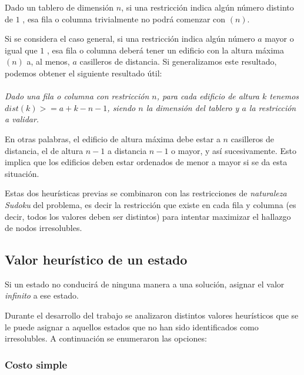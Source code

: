 \documentclass[%
    final,
    reprint,
    notitlepage,
    narroweqnarray,
    inline,
    twoside,
    invited
    ]{ieee}
\begin{document}
\par Dado un tablero de dimensión $n$, si una restricción indica algún número distinto de $1$ , esa fila o columna trivialmente no podrá comenzar con $(n)$.\\
\par Si se considera el caso general, si una restricción indica algún número $a$ mayor o igual que $1$ , esa fila o columna deberá tener un edificio con la altura máxima $(n)$ a, al menos, $a$ casilleros de distancia.  Si generalizamos este resultado, podemos obtener el siguiente resultado útil:\\\\
\emph{Dado una fila o columna con restricción $n$, para cada edificio de altura $k$ tenemos $dist(k) >= a + k - n - 1 $, siendo $n$ la dimensión del tablero y $a$ la restricción a validar.}\\
\par En otras palabras, el edificio de altura máxima debe estar a $n$ casilleros de distancia, el de altura $n-1$ a distancia $n-1$ o mayor, y así sucesivamente. Esto implica que los edificios deben estar ordenados de menor a mayor si se da esta situación.

\par Estas dos heurísticas previas se combinaron con las restricciones de  \textit{naturaleza Sudoku} del problema, es decir la restricción  
que existe en cada fila y columna (es decir, todos los valores deben ser distintos) para intentar maximizar el hallazgo de nodos irresolubles.\\

\subsection{Valor heurístico de un estado}

\par Si un estado no conducirá de ninguna manera a una solución, asignar el valor \textit{infinito} a ese estado. 
\par Durante el desarrollo del trabajo se analizaron distintos valores heurísticos que se le puede asignar a aquellos estados que no han sido 
identificados como irresolubles. A continuación se enumeraron las opciones:

\subsubsection{Costo simple}
\end{document}
